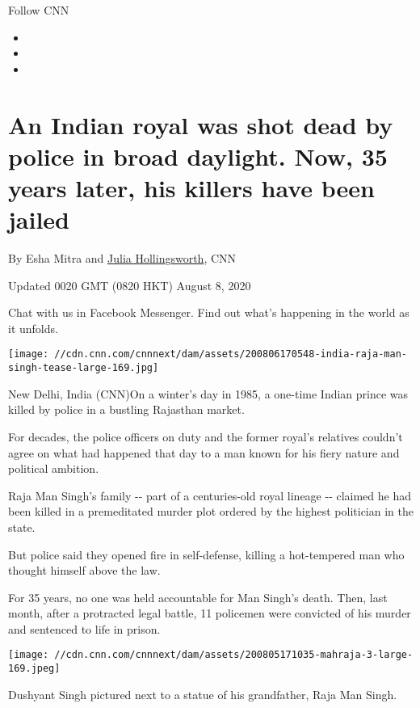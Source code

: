 Follow CNN

\begin{itemize}
\item
\item
\item
\end{itemize}

\hypertarget{an-indian-royal-was-shot-dead-by-police-in-broad-daylight-now-35-years-later-his-killers-have-been-jailed}{%
\section{An Indian royal was shot dead by police in broad daylight. Now,
35 years later, his killers have been
jailed}\label{an-indian-royal-was-shot-dead-by-police-in-broad-daylight-now-35-years-later-his-killers-have-been-jailed}}

By Esha Mitra and \href{/profiles/julia-hollingsworth}{Julia
Hollingsworth}, CNN

Updated 0020 GMT (0820 HKT) August 8, 2020

Chat with us in Facebook Messenger. Find out what's happening in the
world as it unfolds.

\texttt{[image: //cdn.cnn.com/cnnnext/dam/assets/200806170548-india-raja-man-singh-tease-large-169.jpg]}

New Delhi, India (CNN)On a winter's day in 1985, a one-time Indian
prince was killed by police in a bustling Rajasthan market.

For decades, the police officers on duty and the former royal's
relatives couldn't agree on what had happened that day to a man known
for his fiery nature and political ambition.

Raja Man Singh's family -\/- part of a centuries-old royal lineage -\/-
claimed he had been killed in a premeditated murder plot ordered by the
highest politician in the state.

But police said they opened fire in self-defense, killing a hot-tempered
man who thought himself above the law.

For 35 years, no one was held accountable for Man Singh's death. Then,
last month, after a protracted legal battle, 11 policemen were convicted
of his murder and sentenced to life in prison.

\texttt{[image: //cdn.cnn.com/cnnnext/dam/assets/200805171035-mahraja-3-large-169.jpeg]}

Dushyant Singh pictured next to a statue of his grandfather, Raja Man
Singh.

